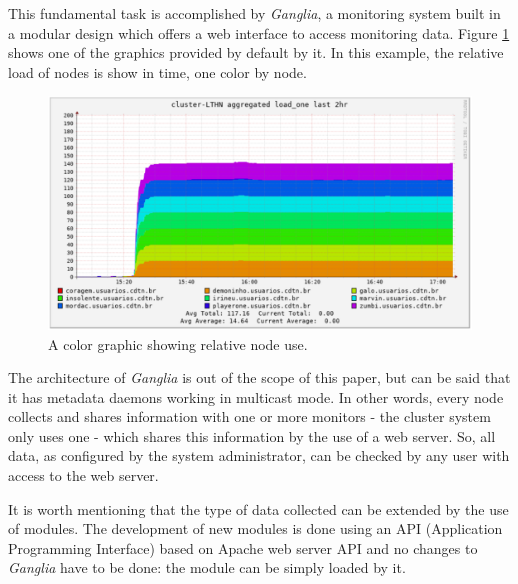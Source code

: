 \documentclass[twoside,a4paper,12pt,english]{inac19}
\begin{document}
This fundamental task is accomplished by \textit{Ganglia}\cite{ganglia}, a monitoring system built in
a modular design which offers a web interface to access monitoring data. Figure \ref{fig:ganglia-rainbow} shows
one of the graphics provided by default by it. In this example, the relative load of nodes is show in time,
one color by node.

\begin{figure}[th] %
  \centering\includegraphics[scale=0.55]{images/ganglia_rainbow.png}
  \caption{A color graphic showing relative node use.}
  \label{fig:ganglia-rainbow}
\end{figure}

The architecture of \textit{Ganglia} is out of the scope of this paper, but can be said that it has metadata
daemons working in multicast mode. In other words, every node collects and shares information with one or
more monitors - the cluster system only uses one - which shares this information by the use of a web server.
So, all data, as configured by the system administrator, can be checked by any user with access to the
web server.

It is worth mentioning that the type of data collected can be extended by the use of modules. The development
of new modules is done using an API (Application Programming Interface) based on Apache web server API\cite{apache}
and no changes to \textit{Ganglia} have to be done: the module can be simply loaded by it.

\end{document}
